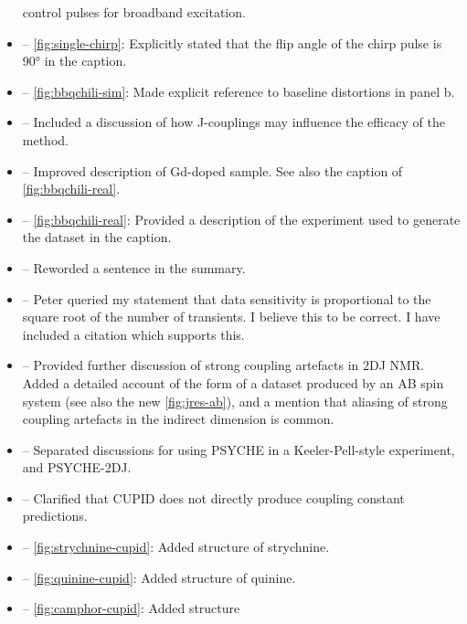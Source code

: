 \documentclass[12pt]{article}
\begin{document}
\begin{itemize}
            control pulses for broadband excitation.
        \item {} -- \cref{fig:single-chirp}: Explicitly
            stated that the flip angle of the chirp pulse is \ang{90} in the
            caption.
        \item {} -- \cref{fig:bbqchili-sim}: Made
            explicit reference to baseline distortions in panel b.
        \item {} -- Included a discussion of how
            J-couplings may influence the efficacy of the method.
        \item {} -- Improved description of Gd-doped sample.
            See also the caption of \cref{fig:bbqchili-real}.
        \item {} -- \cref{fig:bbqchili-real}:
            Provided a description of the experiment used to generate the
            dataset in the caption.
        \item {} -- Reworded a sentence in the summary.
        \item {} -- Peter queried my statement that data
            sensitivity is proportional to the square root of the number of
            transients. I believe this to be correct. I have included a
            citation which supports this.
        \item {} -- Provided further discussion
            of strong coupling artefacts in 2DJ NMR. Added a detailed
            account of the form of a dataset produced by an AB spin system (see
            also the new \cref{fig:jres-ab}), and a mention that aliasing of
            strong coupling artefacts in the indirect dimension is common.
        \item {} -- Separated discussions for using
            PSYCHE in a Keeler-Pell-style experiment, and PSYCHE-2DJ.
        \item {} -- Clarified that CUPID does not
            directly produce coupling constant predictions.
        \item {} -- \cref{fig:strychnine-cupid}: Added
            structure of strychnine.
        \item {} -- \cref{fig:quinine-cupid}: Added structure
            of quinine.
        \item {} -- \cref{fig:camphor-cupid}: Added structure

\end{itemize}
\end{document}
